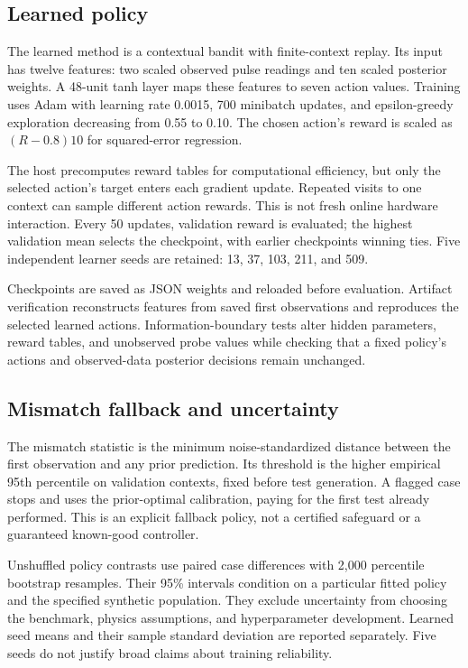 \documentclass[
  10pt,
]{article}
\begin{document}
\subsection{Learned policy}\label{learned-policy}

The learned method is a contextual bandit with finite-context replay.
Its input has twelve features: two scaled observed pulse readings and
ten scaled posterior weights. A 48-unit tanh layer maps these features
to seven action values. Training uses Adam with learning rate 0.0015,
700 minibatch updates, and epsilon-greedy exploration decreasing from
0.55 to 0.10. The chosen action's reward is scaled as \((R-0.8)10\) for
squared-error regression.

The host precomputes reward tables for computational efficiency, but
only the selected action's target enters each gradient update. Repeated
visits to one context can sample different action rewards. This is not
fresh online hardware interaction. Every 50 updates, validation reward
is evaluated; the highest validation mean selects the checkpoint, with
earlier checkpoints winning ties. Five independent learner seeds are
retained: 13, 37, 103, 211, and 509.

Checkpoints are saved as JSON weights and reloaded before evaluation.
Artifact verification reconstructs features from saved first
observations and reproduces the selected learned actions.
Information-boundary tests alter hidden parameters, reward tables, and
unobserved probe values while checking that a fixed policy's actions and
observed-data posterior decisions remain unchanged.

\subsection{Mismatch fallback and
uncertainty}\label{mismatch-fallback-and-uncertainty}

The mismatch statistic is the minimum noise-standardized distance
between the first observation and any prior prediction. Its threshold is
the higher empirical 95th percentile on validation contexts, fixed
before test generation. A flagged case stops and uses the prior-optimal
calibration, paying for the first test already performed. This is an
explicit fallback policy, not a certified safeguard or a guaranteed
known-good controller.

Unshuffled policy contrasts use paired case differences with 2,000
percentile bootstrap resamples. Their 95\% intervals condition on a
particular fitted policy and the specified synthetic population. They
exclude uncertainty from choosing the benchmark, physics assumptions,
and hyperparameter development. Learned seed means and their sample
standard deviation are reported separately. Five seeds do not justify
broad claims about training reliability.
\end{document}
